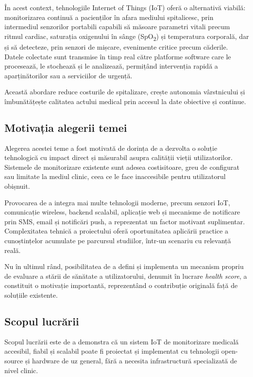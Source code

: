 \documentclass[12pt,a4paper,twoside]{article}
\newcommand{\spo}{SpO\textsubscript{2}}
\begin{document}
În acest context, tehnologiile Internet of Things (IoT) oferă o alternativă viabilă: monitorizarea continuă a pacienților în afara mediului spitalicesc, prin intermediul senzorilor portabili capabili să măsoare parametri vitali precum ritmul cardiac, saturația oxigenului în sânge (\spo) și temperatura corporală, dar și să detecteze, prin senzori de mișcare, evenimente critice precum căderile. Datele colectate sunt transmise în timp real către platforme software care le procesează, le stochează și le analizează, permițând intervenția rapidă a aparținătorilor sau a serviciilor de urgență.

Această abordare reduce costurile de spitalizare, crește autonomia vârstnicului și îmbunătățește calitatea actului medical prin accesul la date obiective și continue.

\subsection{Motivația alegerii temei}

Alegerea acestei teme a fost motivată de dorința de a dezvolta o soluție tehnologică cu impact direct și măsurabil asupra calității vieții utilizatorilor. Sistemele de monitorizare existente sunt adesea costisitoare, greu de configurat sau limitate la mediul clinic, ceea ce le face inaccesibile pentru utilizatorul obișnuit.

Provocarea de a integra mai multe tehnologii moderne, precum senzori IoT, comunicație wireless, backend scalabil, aplicație web și mecanisme de notificare prin SMS, email și notificări push, a reprezentat un factor motivant suplimentar. Complexitatea tehnică a proiectului oferă oportunitatea aplicării practice a cunoștințelor acumulate pe parcursul studiilor, într-un scenariu cu relevanță reală.

Nu în ultimul rând, posibilitatea de a defini și implementa un mecanism propriu de evaluare a stării de sănătate a utilizatorului, denumit în lucrare \textit{health score}, a constituit o motivație importantă, reprezentând o contribuție originală față de soluțiile existente.

\subsection{Scopul lucrării}

Scopul lucrării este de a demonstra că un sistem IoT de monitorizare medicală accesibil, fiabil și scalabil poate fi proiectat și implementat cu tehnologii open-source și hardware de uz general, fără a necesita infrastructură specializată de nivel clinic.
\end{document}
